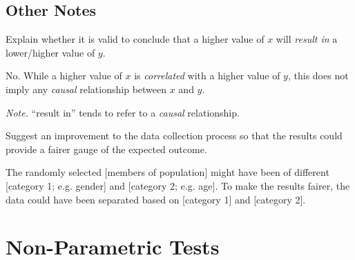 \documentclass[../Notes.tex]{subfiles}
\begin{document}
\section{Other Notes}
\begin{note}
  Explain whether it is valid to conclude that a higher value of \(x\) will \emph{result in} a lower/higher value of \(y\).
  
  \begin{center}
    \parbox{0.9\textwidth}{
      No. While a higher value of \(x\) is \emph{correlated} with a higher value of \(y\), this does not imply any \emph{causal} relationship between \(x\) and \(y\).
    }
  \end{center}
  \emph{Note.} ``result in'' tends to refer to a \emph{causal} relationship.
\end{note}
\begin{example}{}{}
  Suggest an improvement to the data collection process so that the results could provide a fairer gauge of the expected outcome.
  \begin{center}
    \parbox{0.9\textwidth}{
      The randomly selected [members of population] might have been of different [category 1; e.g. gender] and [category 2; e.g. age]. To make the results fairer, the data could have been separated based on [category 1] and [category 2].
    }
  \end{center}
\end{example}
\chapter{Non-Parametric Tests}
\end{document}
